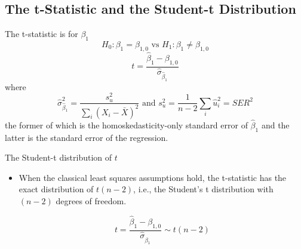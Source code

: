 \documentclass[presentation]{beamer}
\begin{document}
\subsection*{The t-Statistic and the Student-t Distribution}
\label{sec:org4b8dc61}

\begin{frame}[label={sec:orgcc17df0}]{The t-statistic is for \(\beta_1\)}
\[H_0: \beta_1 = \beta_{1,0} \text{ vs } H_1: \beta_1 \neq \beta_{1,0}\]
\begin{equation}
t = \frac{\hat{\beta}_1 - \beta_{1,0}}{\hat{\sigma}_{\hat{\beta}_1}}
\end{equation}
where
\begin{equation*}
\hat{\sigma}^2_{\hat{\beta}_1} = \frac{s^2_u}{\sum_i (X_i - \bar{X})^2} \text{ and } s^2_u = \frac{1}{n-2}\sum_i \hat{u}_i^2 = SER^2
\end{equation*}
the former of which is the homoskedasticity-only standard error of
\(\hat{\beta}_1\) and the latter is the standard error of the
regression.
\end{frame}



\begin{frame}[label={sec:org6b6c4c1}]{The Student-t distribution of \(t\)}
\begin{itemize}
\item When the classical least squares assumptions hold, the
t-statistic has the exact distribution of \(t(n-2)\), i.e., the
Student's t distribution with \((n-2)\) degrees of freedom.

\[ t = \frac{\hat{\beta}_1 -
  \beta_{1,0}}{\hat{\sigma}_{\hat{\beta}_1}} \sim t(n-2) \]
\end{itemize}
\end{frame}
\end{document}
